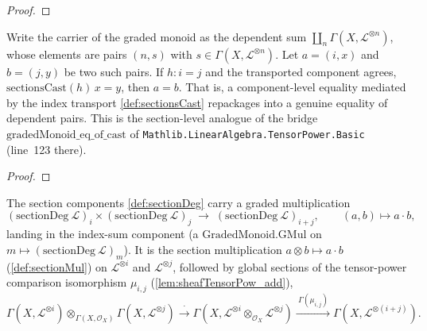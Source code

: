 \begin{proof}\leanok\end{proof}

\begin{lemma}\leanok
  \label{lem:gradedMonoid_eq_of_cast}
  Write the carrier of the graded monoid as the dependent sum
  \(\coprod_{n} \Gamma(X, \mathcal{L}^{\otimes n})\), whose elements are pairs
  \((n, s)\) with \(s \in \Gamma(X, \mathcal{L}^{\otimes n})\). Let
  \(a = (i, x)\) and \(b = (j, y)\) be two such pairs. If \(h : i = j\) and the
  transported component agrees, \(\mathrm{sectionsCast}(h)\,x = y\), then
  \(a = b\). That is, a component-level equality mediated by the index transport
  \cref{def:sectionsCast} repackages into a genuine equality of dependent pairs.
  This is the section-level analogue of the bridge
  \(\mathrm{gradedMonoid\_eq\_of\_cast}\) of
  \texttt{Mathlib.LinearAlgebra.TensorPower.Basic} (line~123 there).
\end{lemma}

\begin{proof}
  \leanok
\end{proof}

\begin{definition}
  \label{def:sectionGradedGMul}
  The section components \cref{def:sectionDeg} carry a graded multiplication
  \[
    (\mathrm{sectionDeg}\ \mathcal{L})_i \times
      (\mathrm{sectionDeg}\ \mathcal{L})_j
    \;\longrightarrow\; (\mathrm{sectionDeg}\ \mathcal{L})_{i+j},
    \qquad (a, b) \longmapsto a \cdot b,
  \]
  landing in the index-sum component (a \(\mathrm{GradedMonoid.GMul}\) on
  \(m \mapsto (\mathrm{sectionDeg}\ \mathcal{L})_m\)). It is the section
  multiplication \(a \otimes b \mapsto a \cdot b\) (\cref{def:sectionMul}) on
  \(\mathcal{L}^{\otimes i}\) and \(\mathcal{L}^{\otimes j}\), followed by global
  sections of the tensor-power comparison isomorphism \(\mu_{i,j}\)
  (\cref{lem:sheafTensorPow_add}),
  \[
    \Gamma(X, \mathcal{L}^{\otimes i}) \otimes_{\Gamma(X,\mathcal{O}_X)}
      \Gamma(X, \mathcal{L}^{\otimes j})
    \xrightarrow{\ \cdot\ }
    \Gamma(X, \mathcal{L}^{\otimes i} \otimes_{\mathcal{O}_X}
      \mathcal{L}^{\otimes j})
    \xrightarrow{\ \Gamma(\mu_{i,j})\ }
    \Gamma(X, \mathcal{L}^{\otimes (i+j)}).
  \]
\end{definition}

